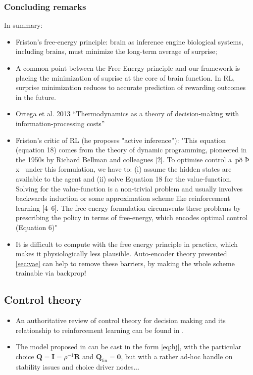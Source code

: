 \documentclass{article} %
\newcommand{\R}{\mathbb{R}}
\def\R{\mathbf{R}}
\def\Q{\mathbf{Q}}
\begin{document}
\subsubsection{Concluding remarks}
In summary:
\begin{itemize}
  \item Friston's free-energy principle: brain as inference engine
  biological systems, including brains, must minimize the long-term average of surprise;
  \item A common point between the Free Energy principle and our framework
  is placing the minimization of suprise at the core of brain function.
  In RL, surprise minimization reduces to accurate prediction of
  rewarding outcomes in the future.
  \item Ortega et al. 2013 \citep{ortega2013thermodynamics} ``Thermodynamics as a theory of decision-making with information-processing costs''
\item Friston's critic of RL \citep{fristonAIorRL} (he proposes "active inference''): "This equation (equation 18) comes from the theory of dynamic programming,
pioneered in the 1950s by Richard Bellman and colleagues [2]. To
optimise control a~pð Þ x~ under this formulation, we have to: (i)
assume the hidden states are available to the agent and (ii) solve
Equation 18 for the value-function. Solving for the value-function
is a non-trivial problem and usually involves backwards induction
or some approximation scheme like reinforcement learning [4–6].
The free-energy formulation circumvents these problems by
prescribing the policy in terms of free-energy, which encodes
optimal control (Equation 6)"
\item It is difficult to compute with the free energy principle
  in practice, which makes it physiologically less plausible. Auto-encoder theory presented
  \ref{sec:vae} can help to remove these barriers, by making the whole scheme trainable via
  backprop!
  \end{itemize}


\subsection{Control theory}
\begin{itemize}
\item An authoritative review of control theory for decision making and its relationship to
  reinforcement learning can be found in \citep{kappen2007introduction}. 
  \item The model proposed in \citep{betzel2016} can be cast in the form \eqref{eq:hj}, with the particular choice $\Q = \textbf{I} = \rho^{-1}\R$ and $\Q_{\text{fin}} = \textbf{0}$, but with a rather ad-hoc handle on stability issues and choice driver nodes...
\end{itemize}
\end{document}
